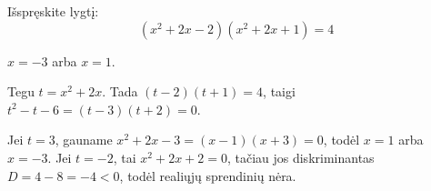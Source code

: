 \begin{salyga}
Išspręskite lygtį:
    \[ (x^2 + 2x - 2)(x^2 + 2x + 1) = 4 \]
\end{salyga}

\begin{atsakymas}
$x=-3$ arba $x=1$.
\end{atsakymas}

\begin{sprendimas}
Tegu $t=x^2+2x$. Tada $(t-2)(t+1)=4$, taigi $t^2-t-6=(t-3)(t+2)=0$.

Jei $t=3$, gauname $x^2+2x-3=(x-1)(x+3)=0$, todėl $x=1$ arba $x=-3$. Jei $t=-2$, tai $x^2+2x+2=0$, tačiau jos diskriminantas $D=4-8=-4<0$, todėl realiųjų sprendinių nėra.
\end{sprendimas}
